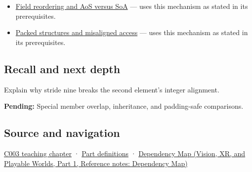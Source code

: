 \begin{itemize}
\tightlist
\item
  \hyperref[appendix-5522ad176ca0]{Field reordering and AoS versus SoA} --- uses this mechanism as stated in its prerequisites.
\item
  \hyperref[appendix-0682dbfc5f0e]{Packed structures and misaligned access} --- uses this mechanism as stated in its prerequisites.
\end{itemize}

\subsection{Recall and next depth}\label{appendix-f52f8c5a3afd-recall-and-next-depth}

\hypertarget{appendix-f52f8c5a3afd-recall-and-next-depth}{}

Explain why stride nine breaks the second element's integer alignment.

\textbf{Pending:} Special member overlap, inheritance, and padding-safe comparisons.

\subsection{Source and navigation}\label{appendix-f52f8c5a3afd-source-and-navigation}

\hypertarget{appendix-f52f8c5a3afd-source-and-navigation}{}

\hyperref[01-foundations-i-ch002-where-the-bytes-live]{C003 teaching chapter} · \hyperref[appendix-fd090d982a15-m003---parts-41-60]{Part definitions} · \href{../07-Vision-XR-and-Playable-Worlds-P01/main.pdf\#appendix-4ad47bdd269a}{Dependency Map (Vision, XR, and Playable Worlds, Part 1, Reference notes: Dependency Map)}
